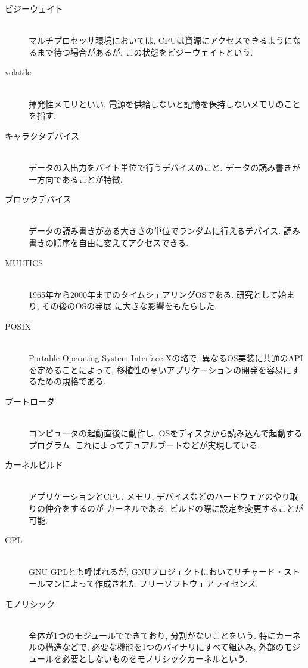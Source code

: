 \documentclass[a4paper, twocolumn]{jarticle}
\begin{document}
\begin{description}
    \cite{ref:memorymaped}
  \item[ビジーウェイト]\mbox{ }\\
    マルチプロセッサ環境においては, CPUは資源にアクセスできるようになるまで待つ場合があるが, 
    この状態をビジーウェイトという. \cite{ref:busy}
  \item[volatile]\mbox{ }\\
    揮発性メモリといい, 電源を供給しないと記憶を保持しないメモリのことを指す. 
    \cite{ref:volatile}
  \item[キャラクタデバイス]\mbox{ }\\
    データの入出力をバイト単位で行うデバイスのこと. データの読み書きが一方向であることが特徴. 
    \cite{ref:chara}
  \item[ブロックデバイス]\mbox{ }\\
    データの読み書きがある大きさの単位でランダムに行えるデバイス. 
    読み書きの順序を自由に変えてアクセスできる.
    \cite{ref:block}
  \item[MULTICS]\mbox{ }\\
    1965年から2000年までのタイムシェアリングOSである. 研究として始まり, その後のOSの発展
    に大きな影響をもたらした. \cite{ref:multics}
  \item[POSIX]\mbox{ }\\
    Portable Operating System Interface Xの略で, 異なるOS実装に共通のAPIを定めることによって, 
    移植性の高いアプリケーションの開発を容易にするための規格である. \cite{ref:posix}
  \item[ブートローダ]\mbox{ }\\
    コンピュータの起動直後に動作し, OSをディスクから読み込んで起動するプログラム. 
    これによってデュアルブートなどが実現している. 
    \cite{ref:boot-loader}
  \item[カーネルビルド]\mbox{ }\\
    アプリケーションとCPU, メモリ, デバイスなどのハードウェアのやり取りの仲介をするのが
    カーネルである, ビルドの際に設定を変更することが可能. 
    \cite{ref:kernel} \cite{ref:kbuild}
  \item[GPL]\mbox{ }\\
    GNU GPLとも呼ばれるが, GNUプロジェクトにおいてリチャード・ストールマンによって作成された
    フリーソフトウェアライセンス. \cite{ref:gpl}
  \item[モノリシック]\mbox{ }\\
    全体が1つのモジュールでできており, 分割がないことをいう. 
    特にカーネルの構造などで, 必要な機能を1つのバイナリにすべて組込み, 
    外部のモジュールを必要としないものをモノリシックカーネルという. \cite{ref:mono}

\end{description}
\end{document}
